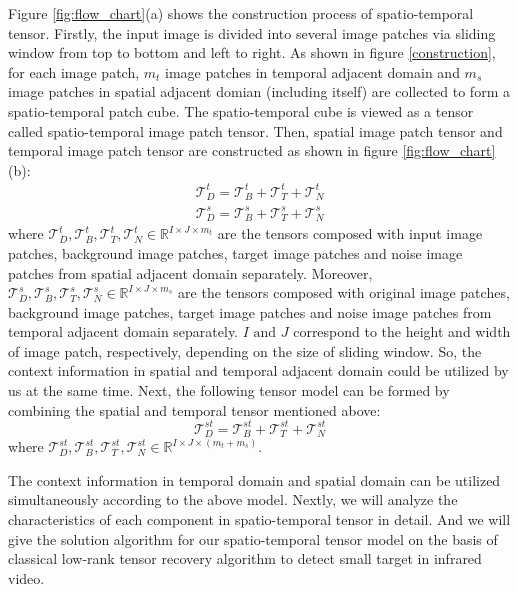 \documentclass[journal]{IEEEtran}
\begin{document}
Figure \ref{fig:flow_chart}(a) shows the construction process of spatio-temporal tensor. Firstly, the input image is divided into several image patches via sliding window from top to bottom and left to right. As shown in figure \ref{construction}, for each image patch, $m_t$ image patches in temporal adjacent domain and $m_s$ image patches in spatial adjacent domian (including itself) are collected to form a spatio-temporal patch cube. The spatio-temporal cube is viewed as a tensor called spatio-temporal image patch tensor. Then, spatial image patch tensor and temporal image patch tensor are constructed as shown in figure \ref{fig:flow_chart}(b):
\begin{equation}
  \begin{split}
    \bm{\mathcal T}_D^t = \bm{\mathcal T}_B^t + \bm{\mathcal T}_T^t + \bm{\mathcal T}_N^t \\
    \bm{\mathcal T}_D^s = \bm{\mathcal T}_B^s + \bm{\mathcal T}_T^s + \bm{\mathcal T}_N^s
  \end{split}
\end{equation}
where $\bm{\mathcal T}_D^t,\bm{\mathcal T}_B^t,\bm{\mathcal T}_T^t,\bm{\mathcal T}_N^t \in {\mathbb R}^{{I}\times{J}\times{m_t}}$ are the tensors composed with input image patches, background image patches, target image patches and noise image patches from spatial adjacent domain separately. Moreover, $\bm{\mathcal T}_D^s,\bm{\mathcal T}_B^s,\bm{\mathcal T}_T^s,\bm{\mathcal T}_N^s \in {\mathbb R}^{{I}\times{J}\times{m_s}}$ are the tensors composed with original image patches, background image patches, target image patches and noise image patches from temporal adjacent domain separately. $I\text{ and }J$ correspond to the height and width of image patch, respectively, depending on the size of sliding window. So, the context information in spatial and temporal adjacent domain could be utilized by us at the same time. Next, the following tensor model can be formed by combining the spatial and temporal tensor mentioned above:
\begin{equation}
  \bm{\mathcal T}_D^{st} = \bm{\mathcal T}_B^{st} + \bm{\mathcal T}_T^{st} + \bm{\mathcal T}_N^{st}
  \label{eq3}
\end{equation}
where $\bm{\mathcal T}_D^{st},\bm{\mathcal T}_B^{st},\bm{\mathcal T}_T^{st},\bm{\mathcal T}_N^{st} \in {\mathbb R}^{{I}\times{J}\times{(m_t+m_s)}}$.

The context information in temporal domain and spatial domain can be utilized simultaneously according to the above model. Nextly, we will analyze the characteristics of each component in spatio-temporal tensor in detail. And we will give the solution algorithm for our spatio-temporal tensor model on the basis of classical low-rank tensor recovery algorithm to detect small target in infrared video.
\end{document}
